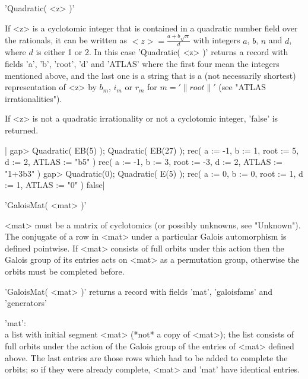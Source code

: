 'Quadratic( <z> )'

If <z> is a cyclotomic integer that is contained in a quadratic number
field over  the rationals, it can  be written as $<z> = \frac{  a +  b
\sqrt{n} }{d}$  with integers  $a$, $b$, $n$  and $d$,  where  $d$  is
either 1 or 2.  In this case 'Quadratic( <z>  )' returns a record with
fields 'a', 'b', 'root', 'd' and 'ATLAS' where the first four mean the
integers mentioned above, and the last one is a string that is a  (not
necessarily  shortest)  representation of <z> by $b_m$, $i_m$ or $r_m$
for $m = '\|root\|'$ (see "ATLAS irrationalities").

If <z>  is not a quadratic irrationality  or not a cyclotomic integer,
'false' is returned.

|    gap> Quadratic( EB(5) ); Quadratic( EB(27) );
    rec(
      a := -1,
      b := 1,
      root := 5,
      d := 2,
      ATLAS := "b5" )
    rec(
      a := -1,
      b := 3,
      root := -3,
      d := 2,
      ATLAS := "1+3b3" )
    gap> Quadratic(0); Quadratic( E(5) );
    rec( 
      a := 0,
      b := 0,
      root := 1,
      d := 1,
      ATLAS := "0" )
    false|


'GaloisMat( <mat> )'

<mat>  must  be  a matrix of  cyclotomics (or  possibly unknowns,  see
"Unknown").  The conjugate of a row in <mat> under a particular Galois
automorphism is  defined  pointwise.  If <mat> consists of full orbits
under this action then the Galois group of its entries acts  on  <mat>
as a permutation group, otherwise the orbits must be completed before.

'GaloisMat( <mat> )' returns a record  with fields 'mat', 'galoisfams'
and 'generators'\:

'mat':\\
      a list with initial  segment <mat> (*not* a  copy of <mat>); the
      list  consists of  full  orbits under the  action of  the Galois
      group  of the entries of  <mat> defined above. The last  entries
      are those rows  which had to be added to complete the orbits; so
      if  they were already complete, <mat> and 'mat'  have  identical
      entries.

